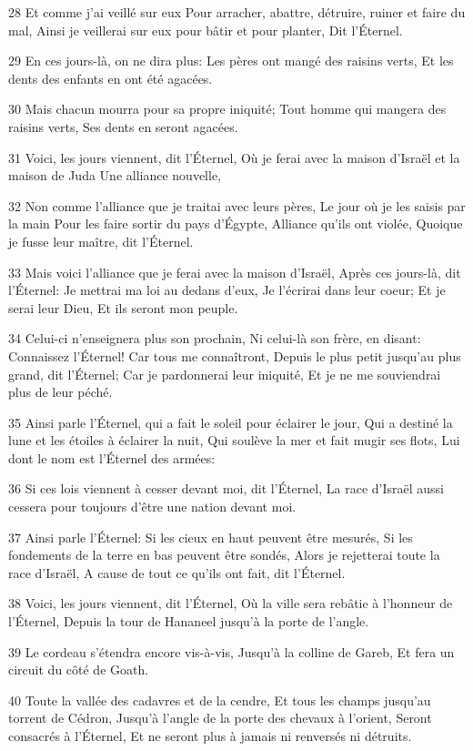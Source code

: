 \par 28 Et comme j'ai veillé sur eux Pour arracher, abattre, détruire, ruiner et faire du mal, Ainsi je veillerai sur eux pour bâtir et pour planter, Dit l'Éternel.
\par 29 En ces jours-là, on ne dira plus: Les pères ont mangé des raisins verts, Et les dents des enfants en ont été agacées.
\par 30 Mais chacun mourra pour sa propre iniquité; Tout homme qui mangera des raisins verts, Ses dents en seront agacées.
\par 31 Voici, les jours viennent, dit l'Éternel, Où je ferai avec la maison d'Israël et la maison de Juda Une alliance nouvelle,
\par 32 Non comme l'alliance que je traitai avec leurs pères, Le jour où je les saisis par la main Pour les faire sortir du pays d'Égypte, Alliance qu'ils ont violée, Quoique je fusse leur maître, dit l'Éternel.
\par 33 Mais voici l'alliance que je ferai avec la maison d'Israël, Après ces jours-là, dit l'Éternel: Je mettrai ma loi au dedans d'eux, Je l'écrirai dans leur coeur; Et je serai leur Dieu, Et ils seront mon peuple.
\par 34 Celui-ci n'enseignera plus son prochain, Ni celui-là son frère, en disant: Connaissez l'Éternel! Car tous me connaîtront, Depuis le plus petit jusqu'au plus grand, dit l'Éternel; Car je pardonnerai leur iniquité, Et je ne me souviendrai plus de leur péché.
\par 35 Ainsi parle l'Éternel, qui a fait le soleil pour éclairer le jour, Qui a destiné la lune et les étoiles à éclairer la nuit, Qui soulève la mer et fait mugir ses flots, Lui dont le nom est l'Éternel des armées:
\par 36 Si ces lois viennent à cesser devant moi, dit l'Éternel, La race d'Israël aussi cessera pour toujours d'être une nation devant moi.
\par 37 Ainsi parle l'Éternel: Si les cieux en haut peuvent être mesurés, Si les fondements de la terre en bas peuvent être sondés, Alors je rejetterai toute la race d'Israël, A cause de tout ce qu'ils ont fait, dit l'Éternel.
\par 38 Voici, les jours viennent, dit l'Éternel, Où la ville sera rebâtie à l'honneur de l'Éternel, Depuis la tour de Hananeel jusqu'à la porte de l'angle.
\par 39 Le cordeau s'étendra encore vis-à-vis, Jusqu'à la colline de Gareb, Et fera un circuit du côté de Goath.
\par 40 Toute la vallée des cadavres et de la cendre, Et tous les champs jusqu'au torrent de Cédron, Jusqu'à l'angle de la porte des chevaux à l'orient, Seront consacrés à l'Éternel, Et ne seront plus à jamais ni renversés ni détruits.

